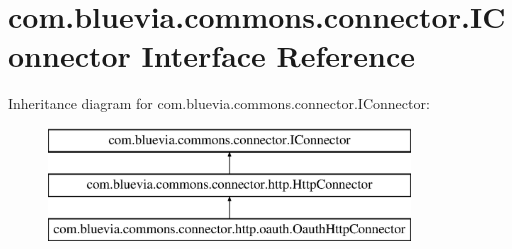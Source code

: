 \hypertarget{interfacecom_1_1bluevia_1_1commons_1_1connector_1_1IConnector}{
\section{com.bluevia.commons.connector.IConnector Interface Reference}
\label{interfacecom_1_1bluevia_1_1commons_1_1connector_1_1IConnector}
}
Inheritance diagram for com.bluevia.commons.connector.IConnector:\begin{figure}[H]
\begin{center}
\leavevmode
\includegraphics[height=3.000000cm]{interfacecom_1_1bluevia_1_1commons_1_1connector_1_1IConnector}
\end{center}
\end{figure}

